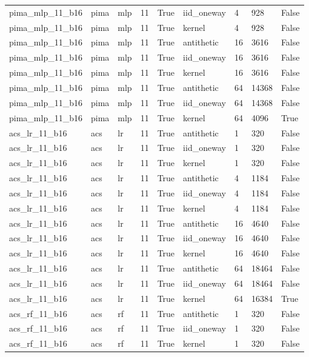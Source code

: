 \begin{tabular}{lllllllll}
pima\_mlp\_11\_b16 & pima & mlp & 11 & True & iid\_oneway & 4 & 928 & False \\
pima\_mlp\_11\_b16 & pima & mlp & 11 & True & kernel & 4 & 928 & False \\
pima\_mlp\_11\_b16 & pima & mlp & 11 & True & antithetic & 16 & 3616 & False \\
pima\_mlp\_11\_b16 & pima & mlp & 11 & True & iid\_oneway & 16 & 3616 & False \\
pima\_mlp\_11\_b16 & pima & mlp & 11 & True & kernel & 16 & 3616 & False \\
pima\_mlp\_11\_b16 & pima & mlp & 11 & True & antithetic & 64 & 14368 & False \\
pima\_mlp\_11\_b16 & pima & mlp & 11 & True & iid\_oneway & 64 & 14368 & False \\
pima\_mlp\_11\_b16 & pima & mlp & 11 & True & kernel & 64 & 4096 & True \\
acs\_lr\_11\_b16 & acs & lr & 11 & True & antithetic & 1 & 320 & False \\
acs\_lr\_11\_b16 & acs & lr & 11 & True & iid\_oneway & 1 & 320 & False \\
acs\_lr\_11\_b16 & acs & lr & 11 & True & kernel & 1 & 320 & False \\
acs\_lr\_11\_b16 & acs & lr & 11 & True & antithetic & 4 & 1184 & False \\
acs\_lr\_11\_b16 & acs & lr & 11 & True & iid\_oneway & 4 & 1184 & False \\
acs\_lr\_11\_b16 & acs & lr & 11 & True & kernel & 4 & 1184 & False \\
acs\_lr\_11\_b16 & acs & lr & 11 & True & antithetic & 16 & 4640 & False \\
acs\_lr\_11\_b16 & acs & lr & 11 & True & iid\_oneway & 16 & 4640 & False \\
acs\_lr\_11\_b16 & acs & lr & 11 & True & kernel & 16 & 4640 & False \\
acs\_lr\_11\_b16 & acs & lr & 11 & True & antithetic & 64 & 18464 & False \\
acs\_lr\_11\_b16 & acs & lr & 11 & True & iid\_oneway & 64 & 18464 & False \\
acs\_lr\_11\_b16 & acs & lr & 11 & True & kernel & 64 & 16384 & True \\
acs\_rf\_11\_b16 & acs & rf & 11 & True & antithetic & 1 & 320 & False \\
acs\_rf\_11\_b16 & acs & rf & 11 & True & iid\_oneway & 1 & 320 & False \\
acs\_rf\_11\_b16 & acs & rf & 11 & True & kernel & 1 & 320 & False \\

\end{tabular}
